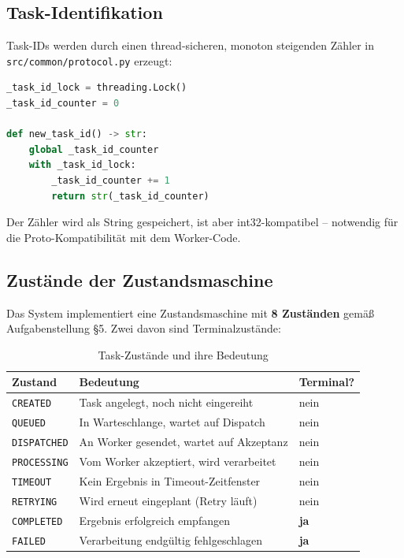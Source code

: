 \subsection{Task-Identifikation}
Task-IDs werden durch einen thread-sicheren, monoton steigenden Zähler
in\\
\texttt{src/common/protocol.py} erzeugt:

\begin{lstlisting}[language=Python,caption={Thread-sichere Task-ID-Generierung}]
_task_id_lock = threading.Lock()
_task_id_counter = 0

def new_task_id() -> str:
    global _task_id_counter
    with _task_id_lock:
        _task_id_counter += 1
        return str(_task_id_counter)
\end{lstlisting}

\noindent Der Zähler wird als String gespeichert, ist aber int32-kompatibel --
notwendig für die Proto-Kompatibilität mit dem Worker-Code.

\subsection{Zustände der Zustandsmaschine}

Das System implementiert eine Zustandsmaschine mit \textbf{8 Zuständen}
gemäß Aufgabenstellung §5. Zwei davon sind Terminalzustände:

\begin{table}[H]
\centering
\begin{tabular}{lll}
\toprule
\textbf{Zustand} & \textbf{Bedeutung} & \textbf{Terminal?} \\
\midrule
\texttt{CREATED}    & Task angelegt, noch nicht eingereiht        & nein \\
\texttt{QUEUED}     & In Warteschlange, wartet auf Dispatch        & nein \\
\texttt{DISPATCHED} & An Worker gesendet, wartet auf Akzeptanz     & nein \\
\texttt{PROCESSING} & Vom Worker akzeptiert, wird verarbeitet      & nein \\
\texttt{TIMEOUT}    & Kein Ergebnis in Timeout-Zeitfenster         & nein \\
\texttt{RETRYING}   & Wird erneut eingeplant (Retry läuft)         & nein \\
\texttt{COMPLETED}  & Ergebnis erfolgreich empfangen               & \textbf{ja} \\
\texttt{FAILED}     & Verarbeitung endgültig fehlgeschlagen        & \textbf{ja} \\
\bottomrule
\end{tabular}
\caption{Task-Zustände und ihre Bedeutung}
\end{table}

